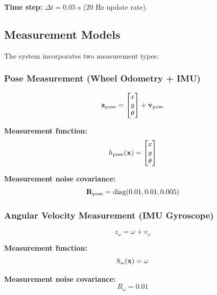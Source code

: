 \textbf{Time step:} $\Delta t = 0.05$ s (20 Hz update rate).

\subsection{Measurement Models}

The system incorporates two measurement types:

\subsubsection{Pose Measurement (Wheel Odometry + IMU)}

\begin{equation}
\mathbf{z}_{\text{pose}} = \begin{bmatrix}
x \\ y \\ \theta
\end{bmatrix} + \mathbf{v}_{\text{pose}}
\label{eq:meas_pose}
\end{equation}

\textbf{Measurement function:}
\begin{equation}
h_{\text{pose}}(\mathbf{x}) = \begin{bmatrix}
x \\ y \\ \theta
\end{bmatrix}
\label{eq:h_pose}
\end{equation}

\textbf{Measurement noise covariance:}
\begin{equation}
\mathbf{R}_{\text{pose}} = \text{diag}(0.01, 0.01, 0.005)
\label{eq:R_pose}
\end{equation}

\subsubsection{Angular Velocity Measurement (IMU Gyroscope)}

\begin{equation}
z_{\omega} = \omega + v_{\omega}
\label{eq:meas_angular}
\end{equation}

\textbf{Measurement function:}
\begin{equation}
h_{\omega}(\mathbf{x}) = \omega
\label{eq:h_angular}
\end{equation}

\textbf{Measurement noise covariance:}
\begin{equation}
R_{\omega} = 0.01
\label{eq:R_angular}
\end{equation}

